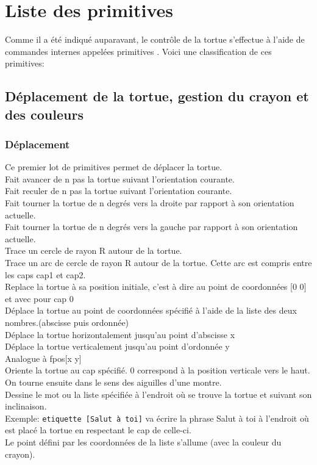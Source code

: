 \chapter{Liste des primitives}
\label{liste-prim} Comme il a été indiqué auparavant, le contrôle de la tortue s'effectue
à l'aide de commandes internes appelées \og primitives \fg. Voici
une classification de ces primitives:


\section{Déplacement de la tortue, gestion du crayon et des couleurs}
\subsection{Déplacement}
\noindent Ce premier lot de primitives permet de déplacer la tortue.\\
Fait avancer de n pas la tortue suivant l'orientation courante.\\
Fait reculer de n pas la tortue suivant l'orientation courante.\\
Fait tourner la tortue de n degrés vers la droite par rapport à son
orientation actuelle.\\
Fait tourner la tortue de n degrés vers la gauche par rapport à son
orientation actuelle.\\
Trace un cercle de rayon R autour de la tortue.\\
 Trace un arc de cercle de rayon R autour de la tortue. Cette arc est compris entre les caps cap1 et cap2.\\
 Replace la tortue à sa position initiale, c'est à dire au point de
coordonnées {[}0 0{]} et avec pour cap 0\\
 Déplace la tortue au point de coordonnées spécifié à l'aide de la
liste des deux nombres.(abscisse puis ordonnée)\\
 Déplace la tortue horizontalement jusqu'au point d'abscisse x\\
 Déplace la tortue verticalement jusqu'au point d'ordonnée y\\
 Analogue à fpos{[}x y{]}\\
 Oriente la tortue au cap spécifié. 0 correspond à la position verticale
vers le haut. On tourne ensuite dans le sens des aiguilles d'une montre.\\
Dessine le mot ou la liste spécifiée à l'endroit où se trouve la tortue et suivant son inclinaison.\\
Exemple: \texttt{etiquette [Salut à toi]} va écrire la phrase \og Salut à toi \fg à l'endroit où est placé la tortue en respectant le cap de celle-ci. \\
Le point défini par les coordonnées de la liste s'allume (avec la couleur du crayon).\\
